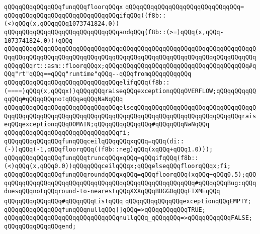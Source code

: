 \verb|qQQqqQQqqQQqqQQqfunqQQqfloorqQQqx|\newline
\verb|qQQqqQQqqQQqqQQqqQQqqQQqqQQqqQQq=|\newline
\verb|qQQqqQQqqQQqqQQqqQQqqQQqqQQqqQQqifqQQq((f8b::(<)qQQq(x,qQQqqQQq1073741824.0))|\newline
\verb|qQQqqQQqqQQqqQQqqQQqqQQqqQQqqQQqandqQQq(f8b::(>=)qQQq(x,qQQq-1073741824.0)))qQQq|\newline
\verb|qQQqqQQqqQQqqQQqqQQqqQQqqQQqqQQqqQQqqQQqqQQqqQQqqQQqqQQqqQQqqQQqqQQqqQQqqQQqqQQqqQQqqQQqqQQqqQQqqQQqqQQqqQQqqQQqqQQqqQQqqQQqqQQqqQQqqQQqqQQqqQQqqQQqrt::asm::floorqQQqx;qQQqqQQqqQQqqQQqqQQqqQQqqQQqqQQqqQQqqQQq#qQQq"rt"qQQq==qQQq"runtime"qQQq--qQQqfromqQQqqQQqqQQq|\newline
\verb|qQQqqQQqqQQqqQQqqQQqqQQqqQQqqQQqelifqQQq(f8b::(====)qQQq(x,qQQqx))qQQqqQQqraiseqQQqexceptionqQQqOVERFLOW;qQQqqQQqqQQqqQQq#qQQqqQQqnotqQQqaqQQqNaNqQQq|\newline
\verb|qQQqqQQqqQQqqQQqqQQqqQQqqQQqqQQqelseqQQqqQQqqQQqqQQqqQQqqQQqqQQqqQQqqQQqqQQqqQQqqQQqqQQqqQQqqQQqqQQqqQQqqQQqqQQqqQQqqQQqqQQqqQQqqQQqqQQqraiseqQQqexceptionqQQqDOMAIN;qQQqqQQqqQQqqQQq#qQQqqQQqNaNqQQq|\newline
\verb|qQQqqQQqqQQqqQQqqQQqqQQqqQQqqQQqfi;|\newline
\newline
\verb|qQQqqQQqqQQqqQQqfunqQQqceilqQQqqQQqxqQQq=qQQq(di::(-))qQQq(-1,qQQqfloorqQQq((f8b::neg)qQQq(xqQQq+qQQq1.0)));|\newline
\verb|qQQqqQQqqQQqqQQqfunqQQqtruncqQQqxqQQq=qQQqifqQQq(f8b::(<)qQQq(x,qQQq0.0))qQQqqQQqceilqQQqx;qQQqelseqQQqfloorqQQqx;fi;|\newline
\verb|qQQqqQQqqQQqqQQqfunqQQqroundqQQqxqQQq=qQQqfloorqQQq(xqQQq+qQQq0.5);qQQqqQQqqQQqqQQqqQQqqQQqqQQqqQQqqQQqqQQqqQQqqQQqqQQqqQQq#qQQqqQQqBug:qQQqdoesqQQqnotqQQqround-to-nearestqQQqXXXqQQqBUGGOqQQqFIXMEqQQq|\newline
\newline
\verb|qQQqqQQqqQQqqQQq#qQQqqQQqListqQQq|\newline
\verb|qQQqqQQqqQQqqQQqexceptionqQQqEMPTY;|\newline
\newline
\verb|qQQqqQQqqQQqqQQqfunqQQqnullqQQq[]qQQq=>qQQqqQQqqQQqTRUE;|\newline
\verb|qQQqqQQqqQQqqQQqqQQqqQQqqQQqqQQqnullqQQq_qQQqqQQq=>qQQqqQQqqQQqFALSE;|\newline
\verb|qQQqqQQqqQQqqQQqend;|\newline

